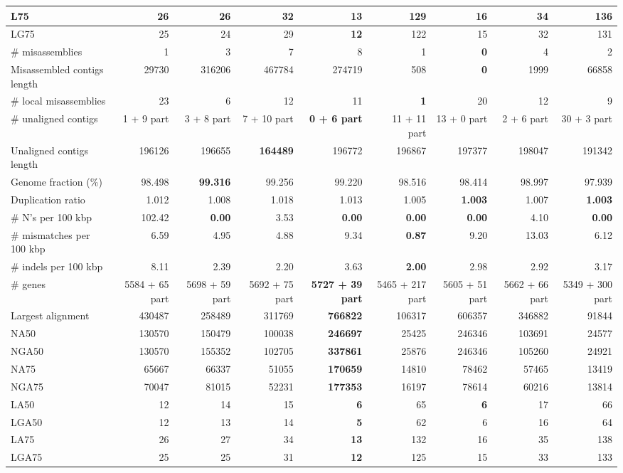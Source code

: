 \documentclass[12pt,a4paper]{article}
\begin{document}
\begin{table}[ht]
\begin{center}
\begin{tabular}{|l*{8}{|r}|}
L75 & 26 & 26 & 32 & {\bf 13} & 129 & 16 & 34 & 136 \\ \hline
LG75 & 25 & 24 & 29 & {\bf 12} & 122 & 15 & 32 & 131 \\ \hline
\# misassemblies & 1 & 3 & 7 & 8 & 1 & {\bf 0} & 4 & 2 \\ \hline
Misassembled contigs length & 29730 & 316206 & 467784 & 274719 & 508 & {\bf 0} & 1999 & 66858 \\ \hline
\# local misassemblies & 23 & 6 & 12 & 11 & {\bf 1} & 20 & 12 & 9 \\ \hline
\# unaligned contigs & 1 + 9 part & 3 + 8 part & 7 + 10 part & {\bf 0 + 6 part} & 11 + 11 part & 13 + 0 part & 2 + 6 part & 30 + 3 part \\ \hline
Unaligned contigs length & 196126 & 196655 & {\bf 164489} & 196772 & 196867 & 197377 & 198047 & 191342 \\ \hline
Genome fraction (\%) & 98.498 & {\bf 99.316} & 99.256 & 99.220 & 98.516 & 98.414 & 98.997 & 97.939 \\ \hline
Duplication ratio & 1.012 & 1.008 & 1.018 & 1.013 & 1.005 & {\bf 1.003} & 1.007 & {\bf 1.003} \\ \hline
\# N's per 100 kbp & 102.42 & {\bf 0.00} & 3.53 & {\bf 0.00} & {\bf 0.00} & {\bf 0.00} & 4.10 & {\bf 0.00} \\ \hline
\# mismatches per 100 kbp & 6.59 & 4.95 & 4.88 & 9.34 & {\bf 0.87} & 9.20 & 13.03 & 6.12 \\ \hline
\# indels per 100 kbp & 8.11 & 2.39 & 2.20 & 3.63 & {\bf 2.00} & 2.98 & 2.92 & 3.17 \\ \hline
\# genes & 5584 + 65 part & 5698 + 59 part & 5692 + 75 part & {\bf 5727 + 39 part} & 5465 + 217 part & 5605 + 51 part & 5662 + 66 part & 5349 + 300 part \\ \hline
Largest alignment & 430487 & 258489 & 311769 & {\bf 766822} & 106317 & 606357 & 346882 & 91844 \\ \hline
NA50 & 130570 & 150479 & 100038 & {\bf 246697} & 25425 & 246346 & 103691 & 24577 \\ \hline
NGA50 & 130570 & 155352 & 102705 & {\bf 337861} & 25876 & 246346 & 105260 & 24921 \\ \hline
NA75 & 65667 & 66337 & 51055 & {\bf 170659} & 14810 & 78462 & 57465 & 13419 \\ \hline
NGA75 & 70047 & 81015 & 52231 & {\bf 177353} & 16197 & 78614 & 60216 & 13814 \\ \hline
LA50 & 12 & 14 & 15 & {\bf 6} & 65 & {\bf 6} & 17 & 66 \\ \hline
LGA50 & 12 & 13 & 14 & {\bf 5} & 62 & 6 & 16 & 64 \\ \hline
LA75 & 26 & 27 & 34 & {\bf 13} & 132 & 16 & 35 & 138 \\ \hline
LGA75 & 25 & 25 & 31 & {\bf 12} & 125 & 15 & 33 & 133 \\ \hline
\end{tabular}
\end{center}
\end{table}
\end{document}
